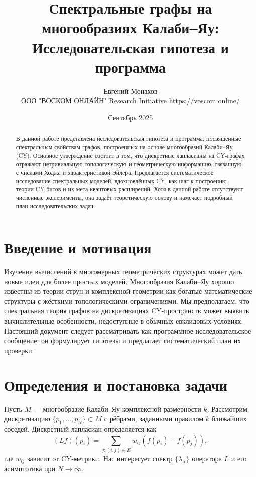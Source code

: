\documentclass[12pt,a4paper]{article}
\title{Спектральные графы на многообразиях Калаби--Яу: \\
Исследовательская гипотеза и программа}
\author{Евгений Монахов \\ ООО "ВОСКОМ ОНЛАЙН" Research Initiative https://voscom.online/}
\date{Сентябрь 2025}
\begin{document}
\maketitle

\begin{abstract}
В данной работе представлена исследовательская гипотеза и программа, 
посвящённые спектральным свойствам графов, построенных на основе 
многообразий Калаби--Яу (CY). 
Основное утверждение состоит в том, что дискретные лапласианы на CY-графах 
отражают нетривиальную топологическую и геометрическую информацию, 
связанную с числами Ходжа и характеристикой Эйлера. 
Предлагается систематическое исследование спектральных моделей, вдохновлённых CY, 
как шаг к построению теории CY-битов и их мета-квантовых расширений. 
Хотя в данной работе отсутствуют численные эксперименты, 
она задаёт теоретическую основу и намечает подробный план исследовательских задач.
\end{abstract}

\section{Введение и мотивация}
Изучение вычислений в многомерных геометрических структурах 
может дать новые идеи для более простых моделей. 
Многообразия Калаби--Яу хорошо известны из теории струн и комплексной геометрии 
как богатые математические структуры с жёсткими топологическими ограничениями. 
Мы предполагаем, что спектральная теория графов на дискретизациях CY-пространств 
может выявить вычислительные особенности, недоступные в обычных евклидовых условиях.  
Настоящий документ следует рассматривать как программное исследовательское сообщение: 
он формулирует гипотезы и предлагает систематический план их проверки.

\section{Определения и постановка задачи}
Пусть $M$ — многообразие Калаби--Яу комплексной размерности $k$.  
Рассмотрим дискретизацию $\{p_1,\dots,p_N\}\subset M$ 
с рёбрами, заданными правилом $k$ ближайших соседей.  
Дискретный лапласиан определяется как
\[
(Lf)(p_i) = \sum_{j:(i,j)\in E} w_{ij}(f(p_i)-f(p_j)),
\]
где $w_{ij}$ зависит от CY-метрики.
Нас интересует спектр $\{\lambda_\alpha\}$ оператора $L$ 
и его асимптотика при $N \to \infty$.
\end{document}

